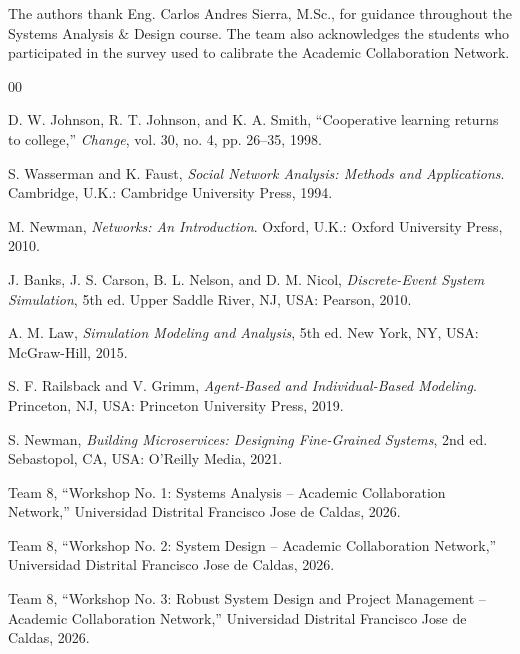 \documentclass[conference]{IEEEtran}
\begin{document}
The authors thank Eng. Carlos Andres Sierra, M.Sc., for guidance throughout the Systems Analysis \& Design course. The team also acknowledges the students who participated in the survey used to calibrate the Academic Collaboration Network.

\begin{thebibliography}{00}

D. W. Johnson, R. T. Johnson, and K. A. Smith, ``Cooperative learning returns to college,'' \emph{Change}, vol. 30, no. 4, pp. 26--35, 1998.

S. Wasserman and K. Faust, \emph{Social Network Analysis: Methods and Applications}. Cambridge, U.K.: Cambridge University Press, 1994.

M. Newman, \emph{Networks: An Introduction}. Oxford, U.K.: Oxford University Press, 2010.

J. Banks, J. S. Carson, B. L. Nelson, and D. M. Nicol, \emph{Discrete-Event System Simulation}, 5th ed. Upper Saddle River, NJ, USA: Pearson, 2010.

A. M. Law, \emph{Simulation Modeling and Analysis}, 5th ed. New York, NY, USA: McGraw-Hill, 2015.

S. F. Railsback and V. Grimm, \emph{Agent-Based and Individual-Based Modeling}. Princeton, NJ, USA: Princeton University Press, 2019.

S. Newman, \emph{Building Microservices: Designing Fine-Grained Systems}, 2nd ed. Sebastopol, CA, USA: O'Reilly Media, 2021.

Team 8, ``Workshop No. 1: Systems Analysis -- Academic Collaboration Network,'' Universidad Distrital Francisco Jose de Caldas, 2026.

Team 8, ``Workshop No. 2: System Design -- Academic Collaboration Network,'' Universidad Distrital Francisco Jose de Caldas, 2026.

Team 8, ``Workshop No. 3: Robust System Design and Project Management -- Academic Collaboration Network,'' Universidad Distrital Francisco Jose de Caldas, 2026.

\end{thebibliography}
\end{document}
